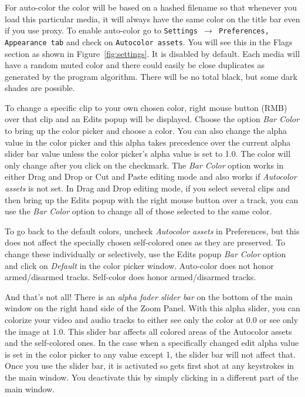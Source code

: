 For auto-color the color will be based on a hashed filename so that whenever you load this particular media, it will always have the same color on the title bar even if you use proxy.  
To enable auto-color go to \texttt{Settings $\rightarrow$ Preferences, Appearance tab} and check on \texttt{Autocolor assets}. You will see this in the Flags section
as shown in Figure~\ref{fig:settings}.  It is disabled by default.  
Each media will have a random muted color and there could easily be close duplicates as generated by the program algorithm.  There will be no total black, but some dark shades are possible.  

To change a specific clip to your own chosen color, right mouse button (RMB) over that clip and an Edits popup will be displayed.  
Choose the option \textit{Bar Color} to bring up the color picker and choose a color.   
You can also change the alpha value in the color picker and this alpha takes precedence over the current alpha slider bar value unless the color picker's alpha value is set to 1.0.   
The color will only change after you click on the checkmark.  
The \emph{Bar Color} option works in either Drag and Drop or Cut and Paste editing mode and also works if \textit{Autocolor assets} is not set.  
In Drag and Drop editing mode, if you select several clips and then bring up the Edits popup with the right mouse button over a track, you can use the \emph{Bar Color} option to change all of those selected to the same color.

To go back to the default colors, uncheck \textit{Autocolor assets} in Preferences, but this does not affect the specially chosen self-colored ones as they are preserved.  
To change these individually or  selectively, use the Edits popup \emph{Bar Color} option and click on \textit{Default} in the color picker window.  Auto-color does not honor armed/disarmed tracks.  
Self-color does honor armed/disarmed tracks.

And that’s not all!  
There is an \emph{alpha fader slider bar} on the bottom of the main window on the right hand side of the Zoom Panel.  
With this alpha slider, you can colorize your video and audio tracks to either see only the color at 0.0 or see only the image at 1.0.  
This slider bar affects all colored areas of the Autocolor assets and the self-colored ones.  
In the case when a specifically changed edit alpha value is set in the color picker
to any value except 1, the slider bar will not affect that.  
Once you use the slider bar, it is activated so gets first shot at any keystrokes in the main window.  
You deactivate this by simply clicking in a different part of the main window.  

